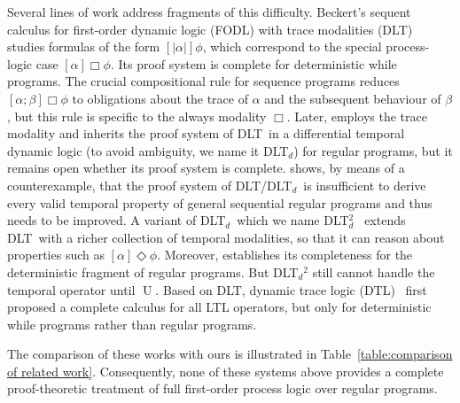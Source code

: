 \documentclass[manuscript,screen]{acmart}
\DeclareMathOperator{\seq}{;}
\DeclareMathOperator{\unt}{U}
\newcommand{\FODL}[0]{\mbox{FODL}}
\newcommand{\DLT}[0]{\mbox{DLT}}
\newcommand{\diffTL}[0]{\mbox{DLT$_d$}}
\newcommand{\diffTLii}[0]{\mbox{DLT$^2_d$}}
\begin{document}
Several lines of work address fragments of this difficulty.  Beckert's sequent calculus for first-order dynamic logic (\FODL) with trace modalities (DLT)~\cite{Beckert01} studies formulas of the form $[|\alpha|]\phi$, which correspond to the special process-logic case $[\alpha]\Box\phi$.
Its proof system is complete for deterministic while programs. 
The crucial compositional rule for sequence programs reduces $[\alpha\seq\beta]\Box\phi$ to obligations about the trace of $\alpha$ and the subsequent behaviour of $\beta$, but this rule is specific to the always modality $\Box$. 
Later, \cite{PlatzersTDL} employs the trace modality and inherits the proof system of \DLT\ in a differential temporal dynamic logic (to avoid ambiguity, we name it \diffTL) for regular programs, but it remains open whether its proof system is complete. 
\cite{Zhang24} shows, by means of a counterexample, that the proof system of DLT/\diffTL\ is insufficient to derive every valid temporal property of general sequential regular programs and thus needs to be improved. 
A variant of \diffTL\ which we name \diffTLii~\cite{DTL2} extends \DLT\ with a richer collection of temporal modalities, so that it can reason about properties such as $[\alpha]\Diamond\phi$. 
Moreover, \cite{Ahmad21} establishes its completeness for the deterministic fragment of regular programs.  
But \diffTL$^2$ still cannot handle the temporal operator until $\unt$. Based on \DLT, dynamic trace logic (DTL)~\cite{Beckert13} first proposed a complete calculus for all LTL operators, but only for deterministic while programs rather than regular programs. 


The comparison of these works with ours is illustrated in Table~\ref{table:comparison of related work}. 
Consequently, none of these systems above provides a complete proof-theoretic treatment of full first-order process logic over regular programs. 
\end{document}
